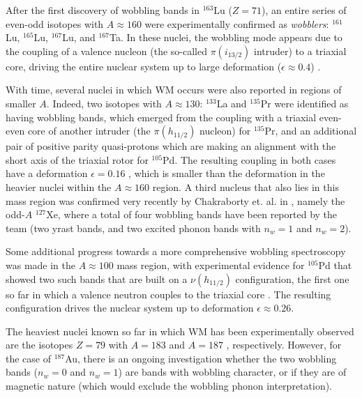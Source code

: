 \documentclass[11pt]{article}
\begin{document}
After the first discovery of wobbling bands in $^{163}$Lu ($Z=71$), an entire series of even-odd isotopes with $A\approx160$ were experimentally confirmed as \emph{wobblers}: $^{161}$Lu, $^{165}$Lu, $^{167}$Lu, and $^{167}$Ta. In these nuclei, the wobbling mode appears due to the coupling of a valence nucleon (the so-called $\pi(i_{13/2})$ intruder) to a triaxial core, driving the entire nuclear system up to large deformation ($\epsilon\approx0.4$) \cite{schnack1995superdeformed}.

With time, several nuclei in which WM occurs were also reported in regions of smaller $A$. Indeed, two isotopes with $A\approx130$: $^{133}$La \cite{biswas2019longitudinal} and $^{135}$Pr \cite{matta2017transverse,sensharma2019two} were identified as having wobbling bands, which emerged from the coupling with a triaxial even-even core of another intruder (the $\pi(h_{11/2})$ nucleon) for $^{135}$Pr, and an additional pair of positive parity quasi-protons which are making an alignment with the short axis of the triaxial rotor for $^{105}$Pd. The resulting coupling in both cases have a deformation $\epsilon=0.16$ \cite{matta2017transverse,biswas2019longitudinal}, which is smaller than the deformation in the heavier nuclei within the $A\approx160$ region. A third nucleus that also lies in this mass region was confirmed very recently by Chakraborty et. al. in \cite{chakraborty2020multiphonon}, namely the odd-$A$ $^{127}$Xe, where a total of four wobbling bands have been reported by the team (two yrast bands, and two excited phonon bands with $n_w=1$ and $n_w=2$).

Some additional progress towards a more comprehensive wobbling spectroscopy was made in the $A\approx100$ mass region, with experimental evidence for $^{105}$Pd that showed two such bands that are built on a $\nu(h_{11/2})$ configuration, the first one so far in which a valence neutron couples to the triaxial core \cite{timar2019experimental}. The resulting configuration drives the nuclear system up to deformation $\epsilon\approx0.26$.

The heaviest nuclei known so far in which WM has been experimentally observed are the isotopes $Z=79$ with $A=183$ \cite{nandi2020first} and $A=187$ \cite{sensharma2020longitudinal}, respectively. However, for the case of $^{187}$Au, there is an ongoing investigation \cite{guo2020risk} whether the two wobbling bands ($n_w=0$ and $n_w=1$) are bands with wobbling character, or if they are of magnetic nature (which would exclude the wobbling phonon interpretation).
\end{document}
